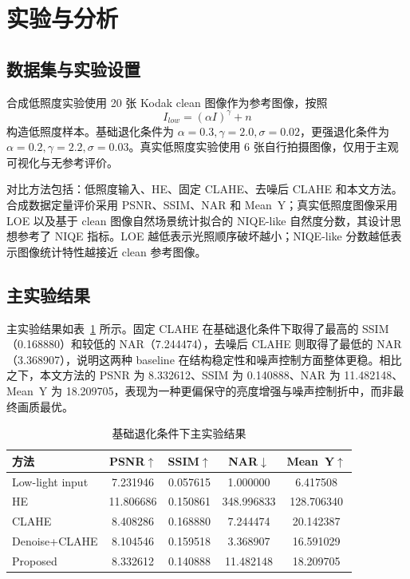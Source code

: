 \section{实验与分析}

\subsection{数据集与实验设置}
合成低照度实验使用 20 张 Kodak clean 图像作为参考图像，按照
\begin{equation}
I_{low}=(\alpha I)^{\gamma}+n
\end{equation}
构造低照度样本。基础退化条件为 $\alpha=0.3,\gamma=2.0,\sigma=0.02$，更强退化条件为 $\alpha=0.2,\gamma=2.2,\sigma=0.03$。真实低照度实验使用 6 张自行拍摄图像，仅用于主观可视化与无参考评价。

对比方法包括：低照度输入、HE、固定 CLAHE、去噪后 CLAHE 和本文方法。合成数据定量评价采用 PSNR、SSIM、NAR 和 Mean~Y；真实低照度图像采用 LOE\cite{wang2013loe} 以及基于 clean 图像自然场景统计拟合的 NIQE-like 自然度分数，其设计思想参考了 NIQE 指标\cite{mittal2012niqe}。LOE 越低表示光照顺序破坏越小；NIQE-like 分数越低表示图像统计特性越接近 clean 参考图像。

\subsection{主实验结果}
主实验结果如表~\ref{tab:main} 所示。固定 CLAHE 在基础退化条件下取得了最高的 SSIM（0.168880）和较低的 NAR（7.244474），去噪后 CLAHE 则取得了最低的 NAR（3.368907），说明这两种 baseline 在结构稳定性和噪声控制方面整体更稳。相比之下，本文方法的 PSNR 为 8.332612、SSIM 为 0.140888、NAR 为 11.482148、Mean~Y 为 18.209705，表现为一种更偏保守的亮度增强与噪声控制折中，而非最终画质最优。

\begin{table}[H]
\centering
\caption{基础退化条件下主实验结果}
\label{tab:main}
\begin{tabular}{lcccc}
\toprule
方法 & PSNR$\uparrow$ & SSIM$\uparrow$ & NAR$\downarrow$ & Mean~Y$\uparrow$ \\
\midrule
Low-light input & 7.231946 & 0.057615 & 1.000000 & 6.417508 \\
HE & 11.806686 & 0.150861 & 348.996833 & 128.706340 \\
CLAHE & 8.408286 & 0.168880 & 7.244474 & 20.142387 \\
Denoise+CLAHE & 8.104546 & 0.159518 & 3.368907 & 16.591029 \\
Proposed & 8.332612 & 0.140888 & 11.482148 & 18.209705 \\
\bottomrule
\end{tabular}
\end{table}

